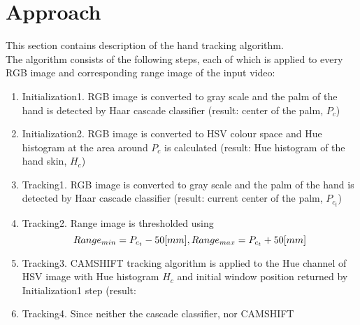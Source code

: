 \documentclass[a4paper, 12pt]{article}
\begin{document}
\section{Approach}
This section contains description of the hand tracking algorithm.\\
The algorithm consists of the following steps, each of which is applied to every RGB image and corresponding range image of the input video:
\begin{enumerate}
\item Initialization1. RGB image is converted to gray scale and the palm of the hand is detected by Haar cascade classifier \cite{Viola01} (result: center of the palm, ${P_c}$)
\item Initialization2. RGB image is converted to HSV colour space and Hue histogram at the area around $P_c$ is calculated (result: Hue histogram of the hand skin, $H_c$)
\item Tracking1. RGB image is converted to gray scale and the palm of the hand is detected by Haar cascade classifier (result: current center of the palm, ${P_{c_t}}$)
\item Tracking2. Range image is thresholded using
    \[
        Range_{min} = {P_{c_t}}-50[mm],  \\
        Range_{max} = {P_{c_t}}+50[mm]
    \]
\item Tracking3. CAMSHIFT tracking algorithm is applied to the Hue channel of HSV image with Hue histogram $H_c$ and initial window position returned by Initialization1 step (result: 
\item Tracking4. Since neither the cascade classifier, nor CAMSHIFT
\end{enumerate}
%        
\end{document}
